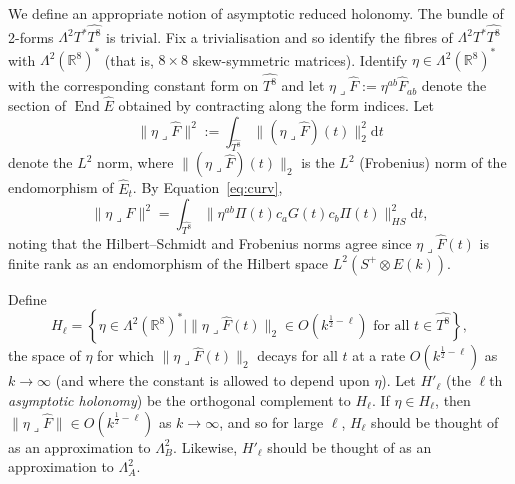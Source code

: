 \documentclass{article}
\newcommand{\di}{\mathrm{d}}
\newcommand{\wh}{\widehat}
\newcommand{\real}{\mathbb{R}}
\DeclareMathOperator\End{End}
\theoremstyle{definition}
\theoremstyle{remark}
\begin{document}
We define an appropriate notion of asymptotic reduced holonomy.
The bundle of 2-forms $\Lambda^2 T^* \wh{T^8}$ is trivial.
Fix a trivialisation and so identify the fibres of $\Lambda^2 T^* \wh{T^8}$ with $\Lambda^2 (\real^8)^*$ (that is, $8 \times 8$ skew-symmetric matrices).
Identify $\eta \in \Lambda^2 (\real^8)^*$ with the corresponding constant form on $\wh{T^8}$ and let $\eta \lrcorner \wh{F} := \eta^{ab} \wh{F}_{ab}$ denote the section of $\End \wh{E}$ obtained by contracting along the form indices.
Let
\[
    \|\eta \lrcorner \wh{F}\|^2 := \int_{\wh{T^8}} \| (\eta\lrcorner \wh{F})(t) \|^2_2 \di t
\]
denote the $L^2$ norm, where $\| (\eta \lrcorner \wh{F})(t)\|_2$ is the $L^2$ (Frobenius) norm of the endomorphism of $\wh{E}_t$.
By Equation~\eqref{eq:curv},
\[
    \|\eta \lrcorner \wh{F}\|^2 = \int_{\wh{T^8}} \| \eta^{ab} \Pi(t) c_a G(t) c_b \Pi(t) \|^2_{HS} \di t,
\]
noting that the Hilbert--Schmidt and Frobenius norms agree since $\eta \lrcorner \wh{F}(t)$ is finite rank as an endomorphism of the Hilbert space $L^2(S^+ \otimes E(k))$.

Define 
\[
    H_\ell = \left\{ \eta \in \Lambda^2( \real^8)^*\mid \|\eta \lrcorner \wh{F}(t)\|_2 \in O(k^{\tfrac12-\ell}) \text{ for all $t \in \wh{T^8}$} \right\},
\]
the space of $\eta$ for which $\|\eta \lrcorner \wh{F}(t)\|_2$ decays for all $t$ at a rate $O(k^{\tfrac12-\ell})$ as $k \to \infty$ (and where the constant is allowed to depend upon $\eta$).
Let $H'_\ell$ (the $\ell$th \emph{asymptotic holonomy}) be the orthogonal complement to $H_\ell$.
If $\eta \in H_\ell$, then $\|\eta\lrcorner\wh{F}\| \in O(k^{\tfrac12 -\ell})$ as $k \to \infty$, and so for large $\ell$, $H_\ell$ should be thought of as an approximation to $\Lambda^2_B$.
Likewise, $H'_\ell$ should be thought of as an approximation to $\Lambda^2_A$.
\end{document}
